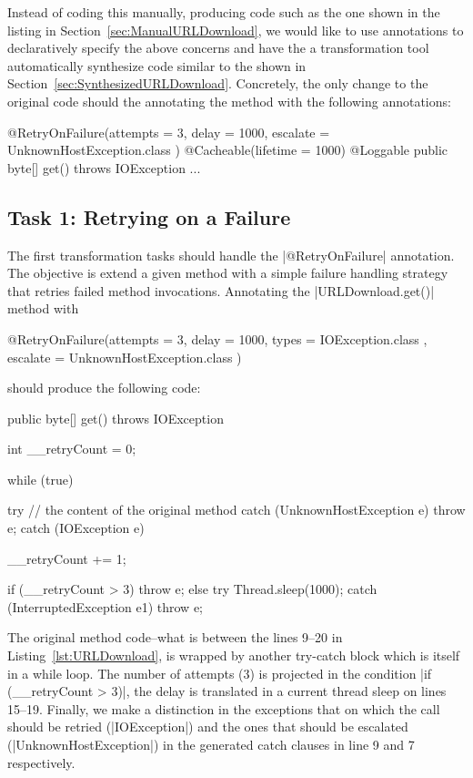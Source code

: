 Instead of coding this manually, producing code such as the one shown in the listing in Section~\ref{sec:ManualURLDownload}, we would like to use annotations to declaratively specify the above concerns and have the a transformation tool automatically synthesize code similar to the shown in Section~\ref{sec:SynthesizedURLDownload}.
Concretely, the only change to the original code should the annotating the method with the following annotations:
%
\begin{javacode}
@RetryOnFailure(attempts = 3, delay = 1000, escalate = { UnknownHostException.class })
@Cacheable(lifetime = 1000)
@Loggable
public byte[] get() throws IOException { ... }
\end{javacode}

\subsection{Task 1: Retrying on a Failure}

The first transformation tasks should handle the \javainline|@RetryOnFailure| annotation.
The objective is extend a given method with a simple failure handling strategy that retries failed method invocations.
Annotating the \javainline|URLDownload.get()| method with
%
\begin{javacode}
@RetryOnFailure(attempts = 3, delay = 1000, types = { IOException.class }, escalate = { UnknownHostException.class })
\end{javacode}
%
should produce the following code:
%
\begin{javacode}
public byte[] get() throws IOException { 
  int __retryCount = 0;

  while (true) {
    try {
      // the content of the original method
    } catch (UnknownHostException e) {
      throw e;
    } catch (IOException e) {
      __retryCount += 1;

      if (__retryCount > 3) {
        throw e;
      } else {
        try {
          Thread.sleep(1000);
        } catch (InterruptedException e1) {
          throw e;
        }
      }
    }
  }
}
\end{javacode}

The original method code--\Ie what is between the lines 9--20 in Listing~\ref{lst:URLDownload}, is wrapped by another try-catch block which is itself in a while loop.
The number of attempts (3) is projected in the condition \javainline|if (__retryCount > 3)|, the delay is translated in a current thread sleep on lines 15--19.
Finally, we make a distinction in the exceptions that on which the call should be retried (\javainline|IOException|) and the ones that should be escalated (\javainline|UnknownHostException|) in the generated catch clauses in line 9 and 7 respectively.

